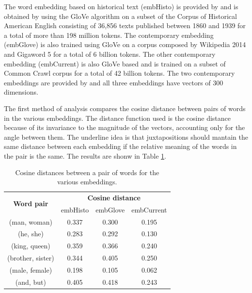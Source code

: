 \documentclass[runningheads]{llncs}
\begin{document}
The word embedding based on historical text (embHisto) is provided by \cite{histo} and is obtained by using the GloVe algorithm on a subset of the Corpus of Historical American English consisting of 36,856 texts published between 1860 and 1939 for a total of more than 198 million tokens. The contemporary embedding (embGlove) is also trained using GloVe on a corpus composed by Wikipedia 2014 and Gigaword 5 for a total of 6 billion tokens. The other contemporary embedding (embCurrent) is also GloVe based and is trained on a subset of Common Crawl corpus for a total of 42 billion tokens. The two contemporary embeddings are provided by \cite{glove} and all three embeddings have vectors of 300 dimensions.

The first method of analysis compares the cosine distance between pairs of words in the various embeddings. The distance function used is the cosine distance because of its invariance to the magnitude of the vectors, accounting only for the angle between them. The underline idea is that juxtapositions should mantain the same distance between each embedding if the relative meaning of the words in the pair is the same. The results are shonw in Table \ref{tab:juxtapos}.

\begin{table}
\centering
\caption{Cosine distances between a pair of words for the various embeddings.}
\label{tab:juxtapos}
\begin{tabular}{|c|c|c|c|}
\hline
\multirow{2}{*}{{\bfseries Word pair}} & \multicolumn{3}{|c|}{{\bfseries Cosine distance}}\\\cline{2-4}
&embHisto&embGlove&embCurrent\\
\hline
(man, woman) &  0.337 & 0.300 & 0.195\\
(he, she) & 0.283 & 0.292 & 0.130\\
(king, queen) & 0.359 & 0.366 & 0.240\\
(brother, sister) & 0.344 & 0.405 & 0.250\\
(male, female) & 0.198 & 0.105 & 0.062\\
(and, but) & 0.405 & 0.418 & 0.243\\
\hline
\end{tabular}
\end{table}
\end{document}
